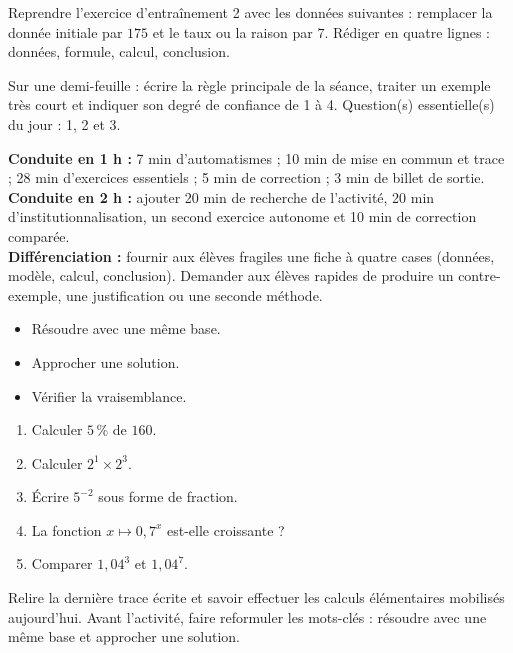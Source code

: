 
\begin{dm}Reprendre l'exercice d'entraînement 2 avec les données suivantes : remplacer la donnée initiale par $175$ et le taux ou la raison par $7$. Rédiger en quatre lignes : données, formule, calcul, conclusion.\end{dm}

\begin{sortie}Sur une demi-feuille : écrire la règle principale de la séance, traiter un exemple très court et indiquer son degré de confiance de 1 à 4. Question(s) essentielle(s) du jour : 1, 2 et 3.\end{sortie}

\ifprof
\begin{methode}
\textbf{Conduite en 1 h :} 7 min d'automatismes ; 10 min de mise en commun et trace ; 28 min d'exercices essentiels ; 5 min de correction ; 3 min de billet de sortie.\\
\textbf{Conduite en 2 h :} ajouter 20 min de recherche de l'activité, 20 min d'institutionnalisation, un second exercice autonome et 10 min de correction comparée.\\
\textbf{Différenciation :} fournir aux élèves fragiles une fiche à quatre cases (données, modèle, calcul, conclusion). Demander aux élèves rapides de produire un contre-exemple, une justification ou une seconde méthode.
\end{methode}
\fi
{}
\begin{objectifs}\begin{itemize}\item Résoudre avec une même base.\item Approcher une solution.\item Vérifier la vraisemblance.\end{itemize}\end{objectifs}
\begin{automatismes}\begin{enumerate}\item Calculer $5\,\%$ de $160$. \item Calculer $2^1\times2^3$. \item Écrire $5^{-2}$ sous forme de fraction. \item La fonction $x\mapsto0{,}7^x$ est-elle croissante ? \item Comparer $1{,}04^3$ et $1{,}04^7$. \end{enumerate}\end{automatismes}
\begin{prerequis}Relire la dernière trace écrite et savoir effectuer les calculs élémentaires mobilisés aujourd'hui. Avant l'activité, faire reformuler les mots-clés : résoudre avec une même base et approcher une solution.\end{prerequis}

